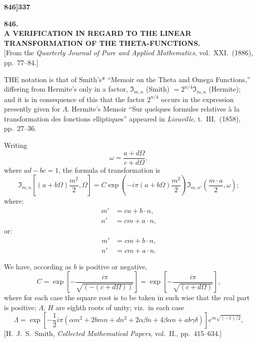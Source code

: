 \documentclass[12pt,a4paper]{article}
\theoremstyle{definition}
\begin{document}
\vspace{2em}


\newpage
\setcounter{page}{337}

\noindent\textbf{846]}\hfill\textbf{337}

\bigskip

\begin{center}
{\Large\textbf{846.}}\\[1em]
{\large\textbf{A VERIFICATION IN REGARD TO THE LINEAR TRANSFORMATION OF THE THETA-FUNCTIONS.}}\\[1em]
[From the \textit{Quarterly Journal of Pure and Applied Mathematics}, vol.\ XXI.\ (1886), pp.\ 77--84.]
\end{center}

\bigskip

\noindent THE notation is that of Smith's* ``Memoir on the Theta and Omega Functions,'' differing from Hermite's only in a factor, $\Im_{m,n}$ (Smith) $= 2^{n/4} \Im_{m,n}$ (Hermite); and it is in consequence of this that the factor $2^{n/4}$ occurs in the expression presently given for $\Lambda$. Hermite's Memoir ``Sur quelques formules relatives \`a la transformation des fonctions elliptiques'' appeared in \textit{Liouville}, t.\ III.\ (1858), pp.\ 27--36.

Writing
\[
\omega = \frac{a + d\Omega}{c + d\Omega},
\]
where $ad - bc = 1$, the formula of transformation is
\[
\Im_{m,n}\left[(a + b\Omega)\frac{m^2}{2}, \Omega\right] = C \exp\left(-i\pi(a + b\Omega)\frac{m^2}{2}\right) \Im_{m,n'}\left(\frac{m\cdot a}{2}, \omega\right);
\]
where:
\begin{align*}
m' &= cu + b \cdot n, \\
n' &= cm + a \cdot n,
\end{align*}
or:
\begin{align*}
m' &= cm + b \cdot n, \\
n' &= cm + a \cdot n.
\end{align*}

We have, according as $b$ is positive or negative,
\[
C = \exp\left[-\frac{i\pi}{\sqrt{(-(c + d\Omega))}}\right] = \exp\left[-\frac{i\pi}{\sqrt{(c + d\Omega)}}\right],
\]
where for each case the square root is to be taken in such wise that the real part is positive; $\Lambda$, $H$ are eighth roots of unity; viz.\ in each case
\[
\Lambda = \exp\left[-\frac{1}{2}i\pi(\alpha m^2 + 2bmn + dn^2 + 2\alpha\beta n + 4\beta\alpha n + ab\gamma\delta)\right] e^{m\sqrt{(-1)/2}},
\]
\hfill *[H.\ J.\ S.\ Smith, \textit{Collected Mathematical Papers}, vol.\ II., pp.\ 415--634.]
\end{document}

